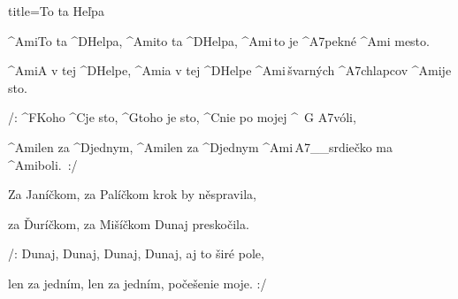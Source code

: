 \begin{song}{title=\predtitle\centering To ta He\v lpa \\\large  \vspace*{-0.3cm}}  %
\begin{centerjustified}
\nejnejvetsi

\sloka 
	^{Ami}To ta ^{D\z}Helpa, ^{Ami}to ta ^{D\z}Helpa, ^{Ami\,}to je ^{A7\z}pekné ^{Ami\,\,}mesto.

	^{Ami}A v tej ^{D\z}Helpe, ^{Ami}a v tej ^{D\z}Helpe ^{Ami\,\z}švarných ^{A7\z}chlapcov ^{Ami}je sto.

	/: ^{F\z}Koho ^{C}je sto, ^{G\z}toho je sto, ^{C}nie po mojej ^{\,\,\,G\,\,A7}vóli,

	^{Ami}len za ^{D\z}jednym, ^{Ami}len za ^{D\z}jednym ^{Ami\,A7{\color{white}\_\_}}srdiečko ma ^{Ami\z}boli.~:/


\sloka
	Za Janíčkom, za Palíčkom krok by něspravila,
	
	za Ďuríčkom, za Mišíčkom Dunaj preskočila.

	/: Dunaj, Dunaj, Dunaj, Dunaj, aj to širé pole,
	
	len za jedním, len za jedním, počešenie moje. :/

\end{centerjustified}
\setcounter{Slokočet}{0}
\end{song}
